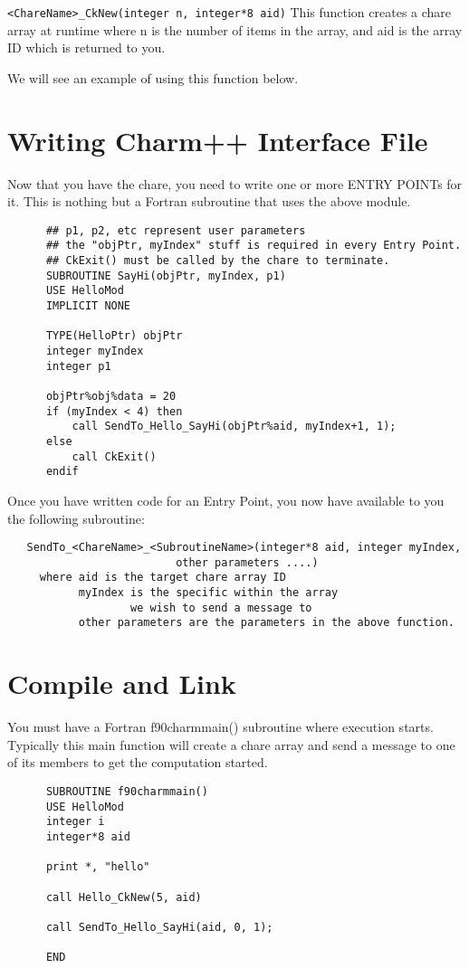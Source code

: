 \documentclass[11pt]{article}
\begin{document}
  \verb+<ChareName>_CkNew(integer n, integer*8 aid)+
     This function creates a chare array at runtime
     where n is the number of items in the array, and
           aid is the array ID which is returned to you.

We will see an example of using this function below.

\section{Writing Charm++ Interface File}

Now that you have the chare, you need to write one or more ENTRY
POINTs for it.  This is nothing but a Fortran subroutine that uses the
above module.
\begin{verbatim}
      ## p1, p2, etc represent user parameters
      ## the "objPtr, myIndex" stuff is required in every Entry Point.
      ## CkExit() must be called by the chare to terminate.
      SUBROUTINE SayHi(objPtr, myIndex, p1)
      USE HelloMod
      IMPLICIT NONE

      TYPE(HelloPtr) objPtr
      integer myIndex
      integer p1

      objPtr%obj%data = 20
      if (myIndex < 4) then
          call SendTo_Hello_SayHi(objPtr%aid, myIndex+1, 1);
      else 
          call CkExit()
      endif
\end{verbatim}
Once you have written code for an Entry Point, you now have available
to you the following subroutine:
\begin{verbatim}
   SendTo_<ChareName>_<SubroutineName>(integer*8 aid, integer myIndex,
                          other parameters ....)
     where aid is the target chare array ID
           myIndex is the specific within the array
                   we wish to send a message to
           other parameters are the parameters in the above function.
\end{verbatim}

\section{Compile and Link}
You must have a Fortran f90charmmain() subroutine where execution starts.
Typically this main function will create a chare array and send a
message to one of its members to get the computation started.
\begin{verbatim}
      SUBROUTINE f90charmmain()
      USE HelloMod
      integer i
      integer*8 aid

      print *, "hello"

      call Hello_CkNew(5, aid)

      call SendTo_Hello_SayHi(aid, 0, 1);

      END
\end{verbatim}
\end{document}
